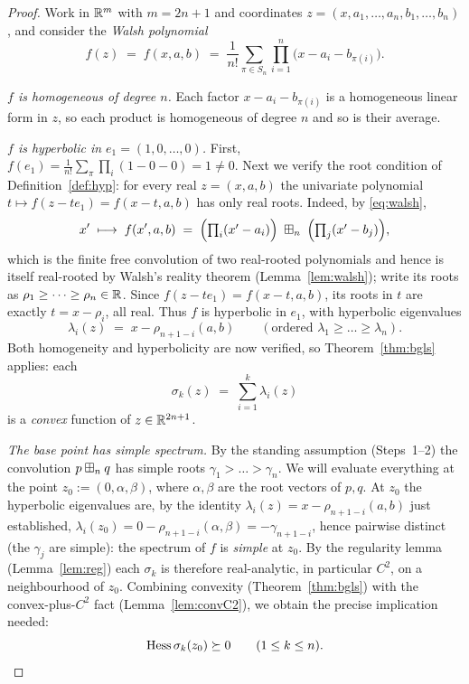 \begin{proof}
Work in $\mathbb{R}^m$ with $m=2n+1$ and coordinates $z=(x,a_1,\dots,a_n,b_1,\dots,b_n)$,
and consider the \emph{Walsh polynomial}
\[
f(z)\;=\;f(x,a,b)\;=\;\frac{1}{n!}\sum_{\pi\in S_n}\prod_{i=1}^n\bigl(x-a_i-b_{\pi(i)}\bigr).
\]

\smallskip\noindent\textit{$f$ is homogeneous of degree $n$.} Each factor
$x-a_i-b_{\pi(i)}$ is a homogeneous linear form in $z$, so each product is
homogeneous of degree $n$ and so is their average.

\smallskip\noindent\textit{$f$ is hyperbolic in $e_1=(1,0,\dots,0)$.} First,
$f(e_1)=\frac1{n!}\sum_\pi\prod_i(1-0-0)=1\ne0$. Next we verify the root
condition of Definition~\ref{def:hyp}: for every real $z=(x,a,b)$ the univariate
polynomial $t\mapsto f(z-te_1)=f(x-t,a,b)$ has only real roots. Indeed, by
\eqref{eq:walsh},
\[
x'\;\longmapsto\;f(x',a,b)\;=\;\Bigl(\textstyle\prod_i(x'-a_i)\Bigr)\;\boxplus_n\;
\Bigl(\textstyle\prod_j(x'-b_j)\Bigr),
\]
which is the finite free convolution of two real-rooted polynomials and hence is
itself real-rooted by Walsh's reality theorem (Lemma~\ref{lem:walsh}); write its
roots as $\rho_1\ge\dots\ge\rho_n\in\mathbb{R}$. Since $f(z-te_1)=f(x-t,a,b)$, its
roots in $t$ are exactly $t=x-\rho_i$, all real. Thus $f$ is hyperbolic in
$e_1$, with hyperbolic eigenvalues
\[
\lambda_i(z)\;=\;x-\rho_{n+1-i}(a,b)\qquad(\text{ordered }\lambda_1\ge\dots\ge\lambda_n).
\]
Both homogeneity and hyperbolicity are now verified, so
Theorem~\ref{thm:bgls} applies: each
\[
\sigma_k(z)\;=\;\sum_{i=1}^k\lambda_i(z)
\]
is a \emph{convex} function of $z\in\mathbb{R}^{2n+1}$.

\smallskip\noindent\textit{The base point has simple spectrum.} By the standing
assumption (Steps~1--2) the convolution $p\boxplus_n q$ has simple roots
$\gamma_1>\dots>\gamma_n$. We will evaluate everything at the point
$z_0:=(0,\alpha,\beta)$, where $\alpha,\beta$ are the root vectors of $p,q$. At
$z_0$ the hyperbolic eigenvalues are, by the identity
$\lambda_i(z)=x-\rho_{n+1-i}(a,b)$ just established,
$\lambda_i(z_0)=0-\rho_{n+1-i}(\alpha,\beta)=-\gamma_{n+1-i}$, hence pairwise
distinct (the $\gamma_j$ are simple): the spectrum of $f$ is \emph{simple} at
$z_0$. By the regularity lemma
(Lemma~\ref{lem:reg}) each $\sigma_k$ is therefore real-analytic, in particular
$C^2$, on a neighbourhood of $z_0$. Combining convexity (Theorem~\ref{thm:bgls})
with the convex-plus-$C^2$ fact (Lemma~\ref{lem:convC2}), we obtain the precise
implication needed:
\begin{equation}\label{eq:Hesssigmak-PSD}
\operatorname{Hess}\sigma_k(z_0)\succeq 0\qquad(1\le k\le n).
\end{equation}


\end{proof}
